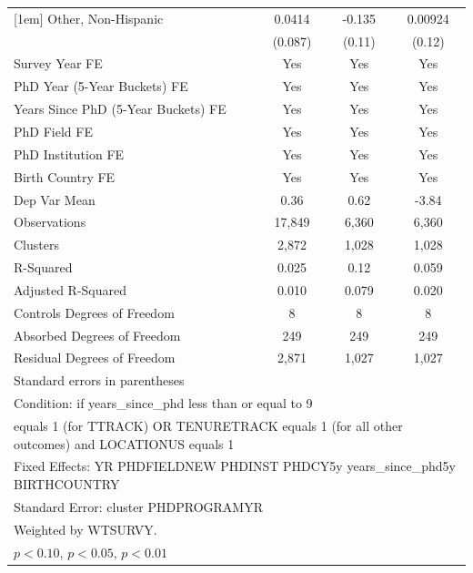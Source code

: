 \begin{table}[htbp]
\begin{tabular}{l*{3}{c}}
[1em]
Other, Non-Hispanic&      0.0414         &      -0.135         &     0.00924         \\
  &     (0.087)         &      (0.11)         &      (0.12)         \\
[1em]
Survey Year FE&         Yes         &         Yes         &         Yes         \\
[1em]
PhD Year (5-Year Buckets) FE&         Yes         &         Yes         &         Yes         \\
[1em]
Years Since PhD (5-Year Buckets) FE&         Yes         &         Yes         &         Yes         \\
[1em]
PhD Field FE&         Yes         &         Yes         &         Yes         \\
[1em]
PhD Institution FE&         Yes         &         Yes         &         Yes         \\
[1em]
Birth Country FE&         Yes         &         Yes         &         Yes         \\
\hline
Dep Var Mean&        0.36         &        0.62         &       -3.84         \\
Observations&      17,849         &       6,360         &       6,360         \\
Clusters&       2,872         &       1,028         &       1,028         \\
R-Squared&       0.025         &        0.12         &       0.059         \\
Adjusted R-Squared&       0.010         &       0.079         &       0.020         \\
Controls Degrees of Freedom&           8         &           8         &           8         \\
Absorbed Degrees of Freedom&         249         &         249         &         249         \\
Residual Degrees of Freedom&       2,871         &       1,027         &       1,027         \\
\hline\hline
\multicolumn{4}{l}{\footnotesize Standard errors in parentheses}\\
\multicolumn{4}{l}{\footnotesize Condition: if years\_since\_phd less than or equal to 9}\\
\multicolumn{4}{l}{\footnotesize equals 1 (for TTRACK) OR TENURETRACK equals 1 (for all other outcomes) and LOCATIONUS equals 1}\\
\multicolumn{4}{l}{\footnotesize Fixed Effects: YR PHDFIELDNEW PHDINST PHDCY5y years\_since\_phd5y BIRTHCOUNTRY}\\
\multicolumn{4}{l}{\footnotesize Standard Error: cluster PHDPROGRAMYR}\\
\multicolumn{4}{l}{\footnotesize Weighted by WTSURVY.}\\
\multicolumn{4}{l}{\footnotesize \sym{*} \(p<0.10\), \sym{**} \(p<0.05\), \sym{***} \(p<0.01\)}\\
\end{tabular}
\end{table}
